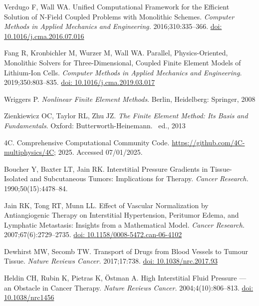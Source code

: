\documentclass[Times1COL,AMA]{WileyNJDv5} %
\begin{document}
\begin{thebibliography}{10}
    Verdugo F, Wall WA. Unified Computational Framework for the Efficient Solution
    of N-Field Coupled Problems with Monolithic Schemes. {\it Computer Methods in
            Applied Mechanics and Engineering.} 2016\string;310\string:335--366.
    \newblock \href {\doibase 10.1016/j.cma.2016.07.016} {doi:
        10.1016/j.cma.2016.07.016}

    Fang R, Kronbichler M, Wurzer M, Wall WA. Parallel, Physics-Oriented,
    Monolithic Solvers for Three-Dimensional, Coupled Finite Element Models of
    Lithium-Ion Cells. {\it Computer Methods in Applied Mechanics and
            Engineering.} 2019\string;350\string:803--835.
    \newblock \href {\doibase 10.1016/j.cma.2019.03.017} {doi:
        10.1016/j.cma.2019.03.017}

    Wriggers P. {\it Nonlinear {{Finite Element Methods}}}.
    \newblock Berlin, Heidelberg: Springer, 2008

    Zienkiewicz OC, Taylor RL, Zhu JZ. {\it The {{Finite Element Method}}: {{Its
            Basis}} and {{Fundamentals}}}.
    \newblock Oxford: Butterworth-Heinemann.
    ~ed., 2013

    {4C}. Comprehensive {{Computational Community Code}}.
    \url{https://github.com/4C-multiphysics/4C}; 2025.
    \newblock Accessed 07/01/2025.

    Boucher Y, Baxter LT, Jain RK. Interstitial Pressure Gradients in
    Tissue-Isolated and Subcutaneous Tumors: Implications for Therapy. {\it
            Cancer Research.} 1990\string;50(15)\string:4478--84.

    Jain RK, Tong RT, Munn LL. Effect of {{Vascular Normalization}} by
        {{Antiangiogenic Therapy}} on {{Interstitial Hypertension}}, {{Peritumor
                    Edema}}, and {{Lymphatic Metastasis}}: {{Insights}} from a {{Mathematical
                    Model}}. {\it Cancer Research.} 2007\string;67(6)\string:2729--2735.
    \newblock \href {\doibase 10.1158/0008-5472.can-06-4102} {doi:
        10.1158/0008-5472.can-06-4102}

    Dewhirst MW, Secomb TW. Transport of Drugs from Blood Vessels to Tumour Tissue.
        {\it Nature Reviews Cancer.} 2017\string;17\string:738.
    \newblock \href {\doibase 10.1038/nrc.2017.93} {doi: 10.1038/nrc.2017.93}

    Heldin CH, Rubin K, Pietras K, {\"O}stman A. High Interstitial Fluid Pressure
    --- an Obstacle in Cancer Therapy. {\it Nature Reviews Cancer.}
    2004\string;4(10)\string:806--813.
    \newblock \href {\doibase 10.1038/nrc1456} {doi: 10.1038/nrc1456}


\end{thebibliography}
\end{document}
